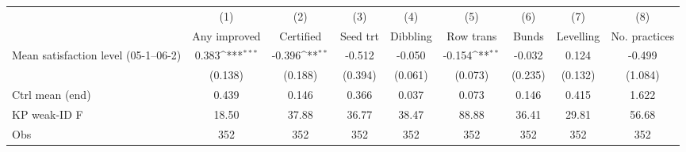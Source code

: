 {
\def\sym#1{\ifmmode^{#1}\else\(^{#1}\)\fi}
\begin{tabular}{l*{8}{c}}
\toprule
                    &\multicolumn{1}{c}{(1)}&\multicolumn{1}{c}{(2)}&\multicolumn{1}{c}{(3)}&\multicolumn{1}{c}{(4)}&\multicolumn{1}{c}{(5)}&\multicolumn{1}{c}{(6)}&\multicolumn{1}{c}{(7)}&\multicolumn{1}{c}{(8)}\\
                    &\multicolumn{1}{c}{Any improved}&\multicolumn{1}{c}{Certified}&\multicolumn{1}{c}{Seed trt}&\multicolumn{1}{c}{Dibbling}&\multicolumn{1}{c}{Row trans}&\multicolumn{1}{c}{Bunds}&\multicolumn{1}{c}{Levelling}&\multicolumn{1}{c}{No. practices}\\
\midrule
Mean satisfaction level (05-1--06-2)&       0.383\sym{***}&      -0.396\sym{**} &      -0.512         &      -0.050         &      -0.154\sym{**} &      -0.032         &       0.124         &      -0.499         \\
                    &     (0.138)         &     (0.188)         &     (0.394)         &     (0.061)         &     (0.073)         &     (0.235)         &     (0.132)         &     (1.084)         \\
\midrule
Ctrl mean (end)     &       0.439         &       0.146         &       0.366         &       0.037         &       0.073         &       0.146         &       0.415         &       1.622         \\
KP weak-ID F        &       18.50         &       37.88         &       36.77         &       38.47         &       88.88         &       36.41         &       29.81         &       56.68         \\
Obs                 &         352         &         352         &         352         &         352         &         352         &         352         &         352         &         352         \\
\bottomrule
\end{tabular}
}
